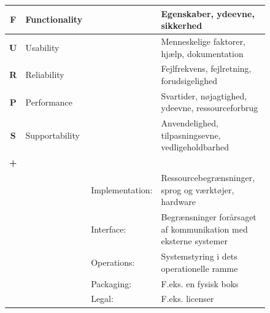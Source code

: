 \begin{figure}[ht]{
    \centering
\begin{tabular}{|c | p{} p{} |p{}|}
       \hline
       \textbf{F}   &   Functionality   &&
       Egenskaber, ydeevne, sikkerhed                   \\
       \hline

       \textbf{U}   &   Usability       &&
       Menneskelige faktorer, hjælp, dokumentation      \\
       \hline

       \textbf{R}   &   Reliability     &&
       Fejlfrekvens, fejlretning, forudsigelighed       \\
       \hline

       \textbf{P}   &   Performance     &&
       Svartider, nøjagtighed, ydeevne, ressourceforbrug                                                      \\
       \hline

       \textbf{S}   &   Supportability  &&
       Anvendelighed, tilpasningsevne, vedligeholdbarhed                                                      \\
       \hline

       \textbf{+}   &                   &&              \\

       &&   Implementation: &   Ressourcebegrænsninger, sprog og værktøjer, hardware                     \\

       &&   Interface:      &   Begrænsninger forårsaget af kommunikation med eksterne systemer              \\

       &&   Operations:     &   Systemstyring i dets operationelle ramme                              \\

       &&   Packaging:      &   F.eks. en fysisk boks   \\

       &&    Legal:         &   F.eks. licenser       \\
       \hline
\end{tabular}}
\end{figure}

\pagebreak

